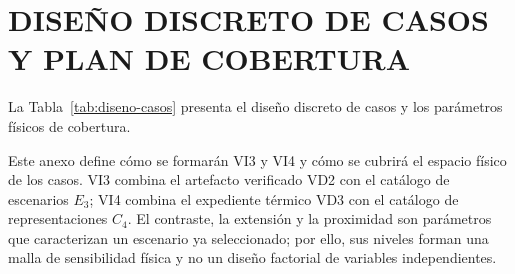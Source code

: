 \section{DISEÑO DISCRETO DE CASOS Y PLAN DE COBERTURA}
\label{anx:diseno-casos}
\thispagestyle{empty}

La Tabla~\ref{tab:diseno-casos} presenta el diseño discreto de casos y los parámetros físicos de cobertura.

Este anexo define cómo se formarán VI3 y VI4 y cómo se cubrirá el espacio físico de los casos. VI3 combina el artefacto verificado VD2 con el catálogo de escenarios $E_3$; VI4 combina el expediente térmico VD3 con el catálogo de representaciones $C_4$. El contraste, la extensión y la proximidad son parámetros que caracterizan un escenario ya seleccionado; por ello, sus niveles forman una malla de sensibilidad física y no un diseño factorial de variables independientes.


